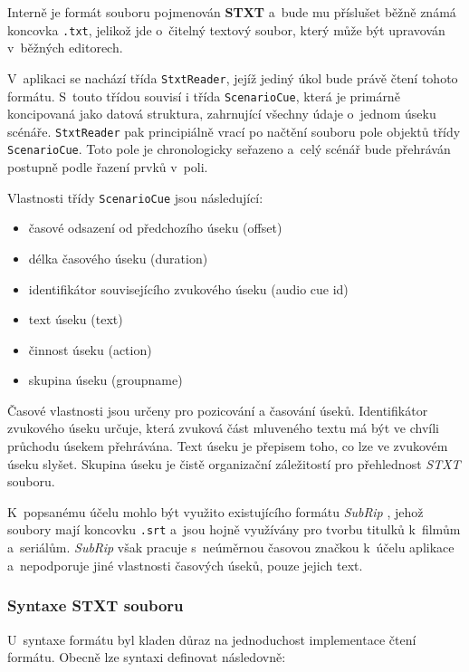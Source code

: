 Interně je formát souboru pojmenován \textbf{STXT} a~bude mu příslušet
běžně známá koncovka \texttt{.txt}, jelikož jde o~čitelný textový
soubor, který může být upravován v~běžných editorech.

V~aplikaci se nachází třída \texttt{StxtReader}, jejíž jediný úkol bude
právě čtení tohoto formátu. S~touto třídou souvisí i třída 
\texttt{ScenarioCue}, která je primárně koncipovaná jako datová
struktura, zahrnující všechny údaje o~jednom úseku scénáře.
\texttt{StxtReader} pak principiálně vrací po načtění souboru pole objektů třídy
\texttt{ScenarioCue}. Toto pole je chronologicky seřazeno a~celý scénář
bude přehráván postupně podle řazení prvků v~poli.

Vlastnosti třídy \texttt{ScenarioCue} jsou následující:

\begin{itemize}
\tightlist
\item
  časové odsazení od předchozího úseku (offset)
\item
  délka časového úseku (duration)
\item
  identifikátor souvisejícího zvukového úseku (audio cue id)
\item
  text úseku (text)
\item
  činnost úseku (action)
\item
  skupina úseku (groupname)
\end{itemize}

Časové vlastnosti jsou určeny pro pozicování a časování úseků.
Identifikátor zvukového úseku určuje, která zvuková část mluveného textu má být ve
chvíli průchodu úsekem přehrávána. Text úseku je přepisem toho, co
lze ve zvukovém úseku slyšet. Skupina úseku je čistě organizační
záležitostí pro přehlednost \emph{STXT} souboru.

K~popsanému účelu mohlo být využito existujícího formátu \emph{SubRip} \autocite{subrip},
jehož soubory mají koncovku \texttt{.srt} a~jsou hojně využívány pro
tvorbu titulků k~filmům a~seriálům. \emph{SubRip} však pracuje
s~neúměrnou časovou značkou k~účelu aplikace a~nepodporuje jiné vlastnosti
časových úseků, pouze jejich text.

\subsubsection{Syntaxe STXT souboru}\label{syntaxe-stxt-souboru}

U~syntaxe formátu byl kladen důraz na jednoduchost implementace čtení
formátu. Obecně lze syntaxi definovat následovně:

